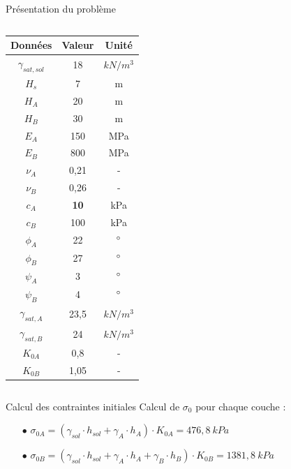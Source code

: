 \documentclass{beamer}
\begin{document}
\begin{frame}{Présentation du problème}
\begin{columns}
\begin{column}{0.49\textwidth}
\begin{table}
    \centering
\begin{tabular}{|c|c|c|}
\hline
Données  & Valeur   & Unité   \\
\hline
$\gamma_{sat,sol}$    & 18   & $kN/m^3$   \\
\hline
$H_s$    & 7   & m   \\ 
\hline
 $H_A$   & 20   & m   \\ 
\hline
$H_B$    & 30   & m   \\ 
\hline
$E_A$    & 150   & MPa   \\ 
\hline
$E_B$    & 800   & MPa   \\ 
\hline
$\nu_A$    & 0,21   & -   \\ 
\hline
$\nu_B$    & 0,26   & -   \\ 
\hline
$c_A$    & \textbf{10}   & kPa   \\ 
\hline
$c_B$    & 100   & kPa  \\ 
\hline
$\phi_A$    & 22   & $\degree$   \\ 
\hline
$\phi_B$    & 27   & $\degree$   \\ 
\hline
$\psi_A$    & 3   & $\degree$   \\ 
\hline
$\psi_B$    & 4   & $\degree$   \\ 
\hline
$\gamma_{sat,A}$    & 23,5   & $kN/m^3$   \\
\hline
$\gamma_{sat,B}$    & 24   & $kN/m^3$   \\
\hline
$K_{0A}$    & 0,8   & -   \\ 
\hline
$K_{0B}$    & 1,05   & -   \\ 
\hline
\end{tabular}
\end{table}

\end{column}

\end{columns}
    
\end{frame}

\begin{frame}{Calcul des contraintes initiales}
Calcul de $\sigma_0$ pour chaque couche :\\
    
    \begin{itemize}
        \item[$\bullet$]$\sigma_{0A} = (\gamma_{sol} \cdot h_{sol} + \gamma_A \cdot h_A) \cdot K_{0A} = 476,8 \ kPa$ \\
    \item[$\bullet$]$ \sigma_{0B} = (\gamma_{sol} \cdot h_{sol} + \gamma_A \cdot h_A + \gamma_B \cdot h_B) \cdot K_{0B} = 1381,8 \ kPa$ \newline
    \end{itemize}


    
\end{frame}
\end{document}
